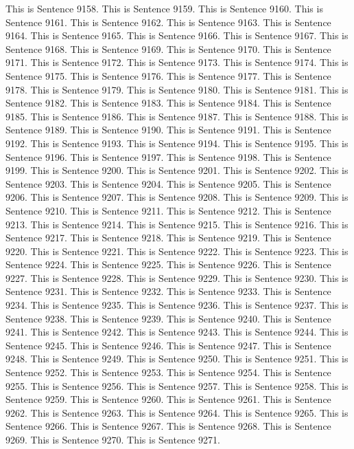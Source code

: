 \documentclass{article}
\begin{document}
This is Sentence 9158.
This is Sentence 9159.
This is Sentence 9160.
This is Sentence 9161.
This is Sentence 9162.
This is Sentence 9163.
This is Sentence 9164.
This is Sentence 9165.
This is Sentence 9166.
This is Sentence 9167.
This is Sentence 9168.
This is Sentence 9169.
This is Sentence 9170.
This is Sentence 9171.
This is Sentence 9172.
This is Sentence 9173.
This is Sentence 9174.
This is Sentence 9175.
This is Sentence 9176.
This is Sentence 9177.
This is Sentence 9178.
This is Sentence 9179.
This is Sentence 9180.
This is Sentence 9181.
This is Sentence 9182.
This is Sentence 9183.
This is Sentence 9184.
This is Sentence 9185.
This is Sentence 9186.
This is Sentence 9187.
This is Sentence 9188.
This is Sentence 9189.
This is Sentence 9190.
This is Sentence 9191.
This is Sentence 9192.
This is Sentence 9193.
This is Sentence 9194.
This is Sentence 9195.
This is Sentence 9196.
This is Sentence 9197.
This is Sentence 9198.
This is Sentence 9199.
This is Sentence 9200.
This is Sentence 9201.
This is Sentence 9202.
This is Sentence 9203.
This is Sentence 9204.
This is Sentence 9205.
This is Sentence 9206.
This is Sentence 9207.
This is Sentence 9208.
This is Sentence 9209.
This is Sentence 9210.
This is Sentence 9211.
This is Sentence 9212.
This is Sentence 9213.
This is Sentence 9214.
This is Sentence 9215.
This is Sentence 9216.
This is Sentence 9217.
This is Sentence 9218.
This is Sentence 9219.
This is Sentence 9220.
This is Sentence 9221.
This is Sentence 9222.
This is Sentence 9223.
This is Sentence 9224.
This is Sentence 9225.
This is Sentence 9226.
This is Sentence 9227.
This is Sentence 9228.
This is Sentence 9229.
This is Sentence 9230.
This is Sentence 9231.
This is Sentence 9232.
This is Sentence 9233.
This is Sentence 9234.
This is Sentence 9235.
This is Sentence 9236.
This is Sentence 9237.
This is Sentence 9238.
This is Sentence 9239.
This is Sentence 9240.
This is Sentence 9241.
This is Sentence 9242.
This is Sentence 9243.
This is Sentence 9244.
This is Sentence 9245.
This is Sentence 9246.
This is Sentence 9247.
This is Sentence 9248.
This is Sentence 9249.
This is Sentence 9250.
This is Sentence 9251.
This is Sentence 9252.
This is Sentence 9253.
This is Sentence 9254.
This is Sentence 9255.
This is Sentence 9256.
This is Sentence 9257.
This is Sentence 9258.
This is Sentence 9259.
This is Sentence 9260.
This is Sentence 9261.
This is Sentence 9262.
This is Sentence 9263.
This is Sentence 9264.
This is Sentence 9265.
This is Sentence 9266.
This is Sentence 9267.
This is Sentence 9268.
This is Sentence 9269.
This is Sentence 9270.
This is Sentence 9271.
\end{document}
